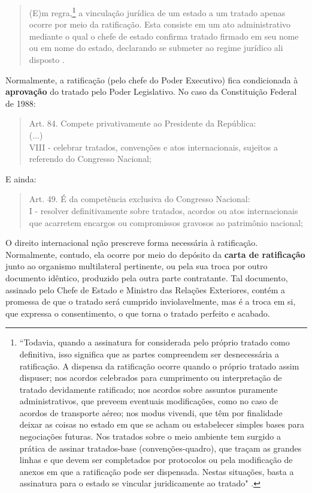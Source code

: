 \documentclass{article}
\begin{document}
\begin{quote}
    (E)m regra,\footnote{``Todavia, quando a assinatura for considerada pelo próprio tratado como definitiva, isso significa que as partes compreendem ser desnecessária a ratificação. A dispensa da ratificação ocorre quando o próprio tratado assim dispuser; nos acordos celebrados para cumprimento ou interpretação de tratado devidamente ratificado; nos acordos sobre assuntos puramente administrativos, que preveem eventuais modificações, como no caso de acordos de transporte aéreo; nos modus vivendi, que têm por finalidade deixar as coisas no estado em que se acham ou estabelecer simples bases para negociações futuras. Nos tratados sobre o meio ambiente tem surgido a prática de assinar tratados-base (convenções-quadro), que traçam as grandes linhas e que devem ser completados por protocolos ou pela modificação de anexos em que a ratificação pode ser dispensada. Nestas situações, basta a assinatura para o estado se vincular juridicamente ao tratado" \cite[p.~159]{accioly_manual_2023}.} a vinculação jurídica de um estado a um tratado apenas ocorre por meio da ratificação. Esta consiste em um ato administrativo mediante o qual o chefe de estado confirma tratado firmado em seu nome ou em nome do estado, declarando se submeter ao regime jurídico ali disposto \cite[p.~159]{accioly_manual_2023}.
\end{quote}

Normalmente, a ratificação (pelo chefe do Poder Executivo) fica condicionada à \textbf{aprovação} do tratado pelo Poder Legislativo. No caso da Constituição Federal de 1988:

\begin{quote}
    Art. 84. Compete privativamente ao Presidente da República:\\
    (...)\\
    VIII - celebrar tratados, convenções e atos internacionais, sujeitos a referendo do Congresso Nacional;
\end{quote}

E ainda:

\begin{quote}
    Art. 49. É da competência exclusiva do Congresso Nacional:\\
    I - resolver definitivamente sobre tratados, acordos ou atos internacionais que acarretem encargos ou compromissos gravosos ao patrimônio nacional; 
\end{quote}

O direito internacional nção prescreve forma necessária à ratificação. Normalmente, contudo, ela ocorre por meio do depósito da \textbf{carta de ratificação} junto ao organismo multilateral pertinente, ou pela sua troca por outro documento idêntico, produzido pela outra parte contratante. Tal documento, assinado pelo Chefe de Estado e Ministro das Relações Exteriores, contém a promessa de que o tratado será cumprido inviolavelmente, mas é a troca em si, que expressa o consentimento, o que torna o tratado perfeito e acabado.
\end{document}
